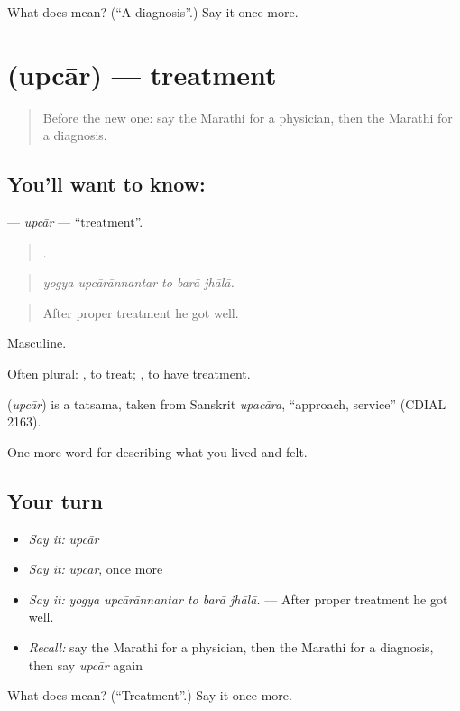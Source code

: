 \begin{tcolorbox}[breakable,colback=teal!4,colframe=teal!35!black,title={Before you move on}]
What does  mean? (\textquotedblleft{}A diagnosis\textquotedblright{}.) Say it once more.
\end{tcolorbox}
\section[\texorpdfstring{\mr{उपचार} (upcār)}{उपचार (upcār)}]{ (upcār) — treatment}

\label{lesson:MR-C488-upcar}



\begin{quote}
Before the new one: say the Marathi for a physician, then the Marathi for a diagnosis.
\end{quote}

\subsection*{You'll want to know: }
\textbf{} — \emph{upcār} — \textquotedblleft{}treatment\textquotedblright{}.

\begin{quote}
    .
\end{quote}

\begin{quote}
\emph{yogya upcārānnantar to barā jhālā.}
\end{quote}

\begin{quote}
After proper treatment he got well.
\end{quote}

Masculine.

Often plural:  , to treat;  , to have treatment.

\begin{cousinweb}
\textbf{} (\emph{upcār}) is a tatsama, taken from Sanskrit \emph{upacāra}, \textquotedblleft{}approach, service\textquotedblright{} (CDIAL 2163).
\end{cousinweb}

\begin{grammarlens}[title={What you've built}]
One more word for describing what you lived and felt.
\end{grammarlens}

\subsection*{Your turn}
\begin{itemize}
\raggedright
  \item \emph{Say it:} \emph{upcār}
  \item \emph{Say it:} \emph{upcār}, once more
  \item \emph{Say it:} \emph{yogya upcārānnantar to barā jhālā.} — After proper treatment he got well.
  \item \emph{Recall:} say the Marathi for a physician, then the Marathi for a diagnosis, then say \emph{upcār} again
\end{itemize}

\begin{tcolorbox}[breakable,colback=teal!4,colframe=teal!35!black,title={Before you move on}]
What does  mean? (\textquotedblleft{}Treatment\textquotedblright{}.) Say it once more.
\end{tcolorbox}
